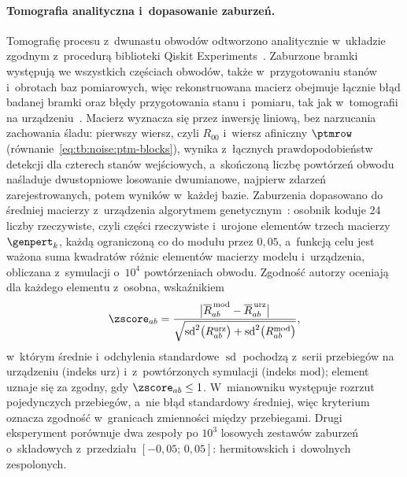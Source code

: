 \paragraph{Tomografia analityczna i~dopasowanie zaburzeń.}
Tomografię procesu z~dwunastu obwodów odtworzono analitycznie w~układzie zgodnym z~procedurą biblioteki Qiskit Experiments~\cite{QiskitTomographyDoc}.
Zaburzone bramki występują we wszystkich częściach obwodów, także w~przygotowaniu stanów i~obrotach baz pomiarowych, więc rekonstruowana macierz obejmuje łącznie błąd badanej bramki oraz błędy przygotowania stanu i~pomiaru, tak jak w~tomografii na urządzeniu~\cite{Merkel2013}.
Macierz wyznacza się przez inwersję liniową, bez narzucania zachowania śladu: pierwszy wiersz, czyli $R_{00}$ i~wiersz afiniczny $\ptmrow$ (równanie~\eqref{eq:tb:noise:ptm-blocks}), wynika z~łącznych prawdopodobieństw detekcji dla czterech stanów wejściowych, a~skończoną liczbę powtórzeń obwodu naśladuje dwustopniowe losowanie dwumianowe, najpierw zdarzeń zarejestrowanych, potem wyników w~każdej bazie.
Zaburzenia dopasowano do średniej macierzy z~urządzenia algorytmem genetycznym~\cite{Holland1975,Goldberg1989}: osobnik koduje 24 liczby rzeczywiste, czyli części rzeczywiste i~urojone elementów trzech macierzy $\genpert_k$, każdą ograniczoną co do modułu przez $0{,}05$, a~funkcją celu jest ważona suma kwadratów różnic elementów macierzy modelu i~urządzenia, obliczana z~symulacji o~$10^4$ powtórzeniach obwodu.
Zgodność autorzy oceniają dla każdego elementu z~osobna, wskaźnikiem
\begin{equation}\label{eq:ns:zscore}
\zscore_{ab}=\frac{\bigl|\overline{R}^{\,\mathrm{mod}}_{ab}-\overline{R}^{\,\mathrm{urz}}_{ab}\bigr|}{\sqrt{\operatorname{sd}^2\bigl(R^{\mathrm{urz}}_{ab}\bigr)+\operatorname{sd}^2\bigl(R^{\mathrm{mod}}_{ab}\bigr)}},
\end{equation}
w~którym średnie i~odchylenia standardowe $\operatorname{sd}$ pochodzą z~serii przebiegów na urządzeniu (indeks $\mathrm{urz}$) i~z~powtórzonych symulacji (indeks $\mathrm{mod}$); element uznaje się za zgodny, gdy $\zscore_{ab}\le1$.
W~mianowniku występuje rozrzut pojedynczych przebiegów, a~nie błąd standardowy średniej, więc kryterium oznacza zgodność w~granicach zmienności między przebiegami.
Drugi eksperyment porównuje dwa zespoły po $10^3$ losowych zestawów zaburzeń o~składowych z~przedziału $[-0{,}05;\,0{,}05]$: hermitowskich i~dowolnych zespolonych.

